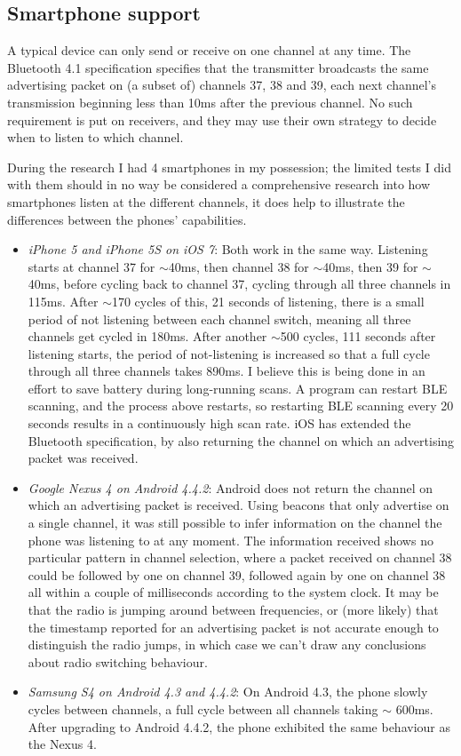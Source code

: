 \subsection{Smartphone support}
A typical device can only send or receive on one channel at any time.
The Bluetooth 4.1 specification \citep{bluetooth41spec} specifies that the transmitter broadcasts the same advertising packet on (a subset of) channels 37, 38 and 39, each next channel's transmission beginning less than 10ms after the previous channel. 
No such requirement is put on receivers, and they may use their own strategy to decide when to listen to which channel.


During the research I had 4 smartphones in my possession; the limited tests I did with them should in no way be considered a comprehensive research into how smartphones listen at the different channels, it does help to illustrate the differences between the phones' capabilities.
\begin{itemize}
    \item \emph{iPhone 5 and iPhone 5S on iOS 7}: Both work in the same way.
        Listening starts at channel 37 for $\sim$40ms, then channel 38 for $\sim$40ms, then 39 for $\sim$40ms, before cycling back to channel 37, cycling through all three channels in 115ms.
        After $\sim$170 cycles of this, 21 seconds of listening, there is a small period of not listening between each channel switch, meaning all three channels get cycled in 180ms.
        After another $\sim$500 cycles, 111 seconds after listening starts, the period of not-listening is increased so that a full cycle through all three channels takes 890ms.
        I believe this is being done in an effort to save battery during long-running scans.
        A program can restart BLE scanning, and the process above restarts, so restarting BLE scanning every 20 seconds results in a continuously high scan rate.
        iOS has extended the Bluetooth specification, by also returning the channel on which an advertising packet was received.
    \item \emph{Google Nexus 4 on Android 4.4.2}: Android does not return the channel on which an advertising packet is received. 
        Using beacons that only advertise on a single channel, it was still possible to infer information on the channel the phone was listening to at any moment.
        The information received shows no particular pattern in channel selection, where a packet received on channel 38 could be followed by one on channel 39, followed again by one on channel 38 all within a couple of milliseconds according to the system clock.
        It may be that the radio is jumping around between frequencies, or (more likely) that the timestamp reported for an advertising packet is not accurate enough to distinguish the radio jumps, in which case we can't draw any conclusions about radio switching behaviour.
    \item \emph{Samsung S4 on Android 4.3 and 4.4.2}: On Android 4.3, the phone slowly cycles between channels, a full cycle between all channels taking $\sim$ 600ms.
        After upgrading to Android 4.4.2, the phone exhibited the same behaviour as the Nexus 4.
\end{itemize}
        
